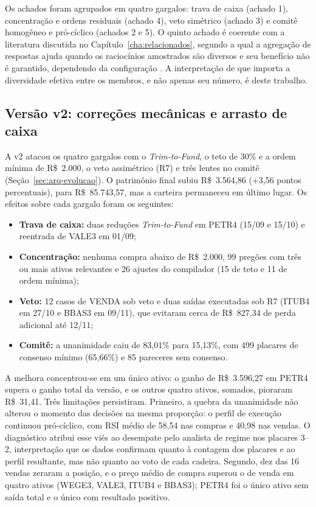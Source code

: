 Os achados foram agrupados em quatro gargalos: trava de caixa (achado 1), concentração e ordens residuais (achado 4), veto simétrico (achado 3) e comitê homogêneo e pró-cíclico (achados 2 e 5). O quinto achado é coerente com a literatura discutida no Capítulo~\ref{cha:relacionados}, segundo a qual a agregação de respostas ajuda quando os raciocínios amostrados são diversos \citep{Wang2023} e seu benefício não é garantido, dependendo da configuração \citep{Smit2024}. A interpretação de que importa a diversidade efetiva entre os membros, e não apenas seu número, é deste trabalho.

\subsection{Versão v2: correções mecânicas e arrasto de caixa}
\label{sec:res-v2}

A v2 atacou os quatro gargalos com o \textit{Trim-to-Fund}, o teto de 30\% e a ordem mínima de R\$~2.000, o veto assimétrico (R7) e três lentes no comitê (Seção~\ref{sec:arq-evolucao}). O patrimônio final subiu R\$~3.564,86 (+3,56 pontos percentuais), para R\$~85.743,57, mas a carteira permaneceu em último lugar. Os efeitos sobre cada gargalo foram os seguintes:

\begin{itemize}
    \item \textbf{Trava de caixa:} duas reduções \textit{Trim-to-Fund} em PETR4 (15/09 e 15/10) e reentrada de VALE3 em 01/09;
    \item \textbf{Concentração:} nenhuma compra abaixo de R\$~2.000, 99 pregões com três ou mais ativos relevantes e 26 ajustes do compilador (15 de teto e 11 de ordem mínima);
    \item \textbf{Veto:} 12 casos de VENDA sob veto e duas saídas executadas sob R7 (ITUB4 em 27/10 e BBAS3 em 09/11), que evitaram cerca de R\$~827,34 de perda adicional até 12/11;
    \item \textbf{Comitê:} a unanimidade caiu de 83,01\% para 15,13\%, com 499 placares de consenso mínimo (65,66\%) e 85 pareceres sem consenso.
\end{itemize}

A melhora concentrou-se em um único ativo: o ganho de R\$~3.596,27 em PETR4 supera o ganho total da versão, e os outros quatro ativos, somados, pioraram R\$~31,41. Três limitações persistiram. Primeiro, a quebra da unanimidade não alterou o momento das decisões na mesma proporção: o perfil de execução continuou pró-cíclico, com RSI médio de 58,54 nas compras e 40,98 nas vendas. O diagnóstico atribui esse viés ao desempate pelo analista de regime nos placares 3--2, interpretação que os dados confirmam quanto à contagem dos placares e ao perfil resultante, mas não quanto ao voto de cada cadeira. Segundo, dez das 16 vendas zeraram a posição, e o preço médio de compra superou o de venda em quatro ativos (WEGE3, VALE3, ITUB4 e BBAS3); PETR4 foi o único ativo sem saída total e o único com resultado positivo.

